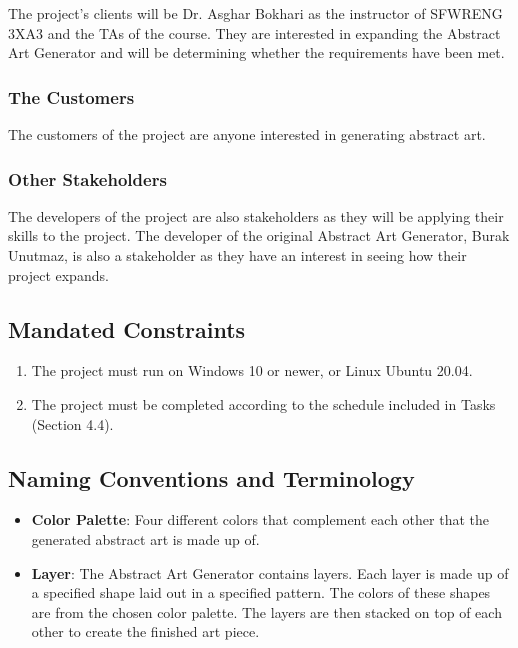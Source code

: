\documentclass[12pt, titlepage]{article}
\begin{document}
The project's clients will be Dr. Asghar Bokhari as the instructor of SFWRENG 3XA3 and the TAs of the course. They are interested in expanding the Abstract Art Generator and will be determining whether the requirements have been met.

\subsubsection{The Customers}

The customers of the project are anyone interested in generating abstract art. 

\subsubsection{Other Stakeholders}

The developers of the project are also stakeholders as they will be applying their skills to the project. The developer of the original Abstract Art Generator, Burak Unutmaz, is also a stakeholder as they have an interest in seeing how their project expands.

\subsection{Mandated Constraints}

\begin{enumerate}
    \item The project must run on Windows 10 or newer, or Linux Ubuntu 20.04.
    \item The project must be completed according to the schedule included in Tasks (Section 4.4).
\end{enumerate}

\subsection{Naming Conventions and Terminology}

\begin{itemize}
    \item \textbf{Color Palette}: Four different colors that complement each other that the generated abstract art is made up of.
    \item \textbf{Layer}: The Abstract Art Generator contains layers. Each layer is made up of a specified shape laid out in a specified pattern. The colors of these shapes are from the chosen color palette. The layers are then stacked on top of each other to create the finished art piece.
\end{itemize}
\end{document}
